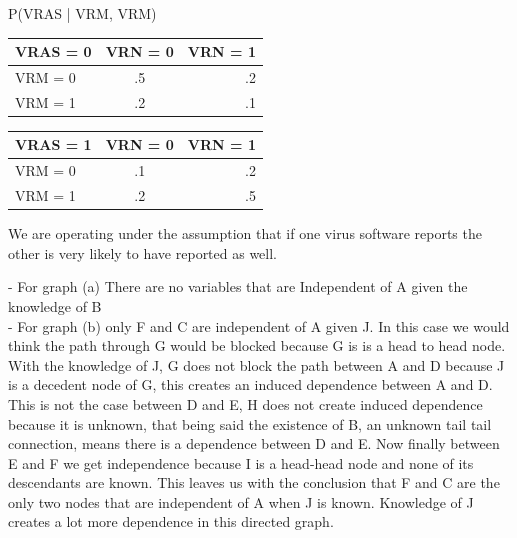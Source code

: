 \documentclass[solution, letterpaper]{cs121}
\begin{document}
\begin{empfile}
P(VRAS | VRM, VRM)\\
\begin{center}
\begin{tabular}{ l |c r }
   VRAS = 0 & VRN = 0& VRN = 1 \\
   \hline
  VRM = 0 & .5 & .2 \\
  VRM = 1 & .2 & .1 \\
\end{tabular}
\end{center}

\begin{center}
\begin{tabular}{ l |c r }
   VRAS = 1 & VRN = 0 & VRN = 1 \\
   \hline
  VRM = 0 & .1 & .2 \\
  VRM = 1 & .2 & .5 \\
\end{tabular}
\end{center}
We are operating under the assumption that if one virus software reports the other is very likely to have reported as well.

\subproblem 
- For graph (a) There are no variables that are Independent of A given the knowledge of B\\

- For graph (b) only F and C are independent of A given J. In this case we would think the path through G would be blocked because G is is a head to head node. With the knowledge of J, G does not block the path between A and D because J is a decedent node of G, this creates an induced dependence between A and D. This is not the case between D and E, H does not create induced dependence because it is unknown, that being said the existence of B, an unknown tail tail connection, means there is a dependence between D and E. Now finally between E and F we get independence because I is a head-head node and none of its descendants are known. This leaves us with the conclusion that F and C are the only two nodes that are independent of A when J is known. Knowledge of J creates a lot more dependence in this directed graph.



\end{empfile}
\end{document}
